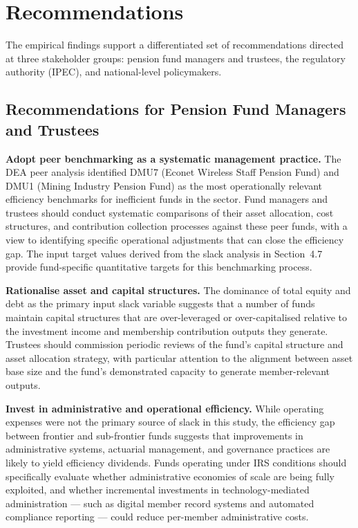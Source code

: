 \documentclass[12pt,a4paper]{article}
\begin{document}
\section{Recommendations}

The empirical findings support a differentiated set of recommendations directed at three stakeholder groups: pension fund managers and trustees, the regulatory authority (IPEC), and national-level policymakers.

\subsection{Recommendations for Pension Fund Managers and Trustees}

\textbf{Adopt peer benchmarking as a systematic management practice.} The DEA peer analysis identified DMU7 (Econet Wireless Staff Pension Fund) and DMU1 (Mining Industry Pension Fund) as the most operationally relevant efficiency benchmarks for inefficient funds in the sector. Fund managers and trustees should conduct systematic comparisons of their asset allocation, cost structures, and contribution collection processes against these peer funds, with a view to identifying specific operational adjustments that can close the efficiency gap. The input target values derived from the slack analysis in Section~4.7 provide fund-specific quantitative targets for this benchmarking process.

\textbf{Rationalise asset and capital structures.} The dominance of total equity and debt as the primary input slack variable suggests that a number of funds maintain capital structures that are over-leveraged or over-capitalised relative to the investment income and membership contribution outputs they generate. Trustees should commission periodic reviews of the fund's capital structure and asset allocation strategy, with particular attention to the alignment between asset base size and the fund's demonstrated capacity to generate member-relevant outputs.

\textbf{Invest in administrative and operational efficiency.} While operating expenses were not the primary source of slack in this study, the efficiency gap between frontier and sub-frontier funds suggests that improvements in administrative systems, actuarial management, and governance practices are likely to yield efficiency dividends. Funds operating under IRS conditions should specifically evaluate whether administrative economies of scale are being fully exploited, and whether incremental investments in technology-mediated administration --- such as digital member record systems and automated compliance reporting --- could reduce per-member administrative costs.
\end{document}
